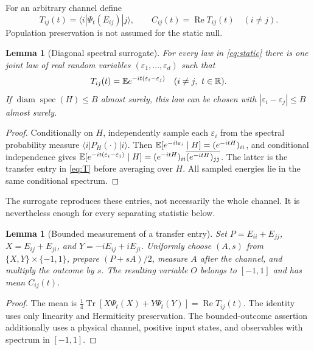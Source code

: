 \documentclass[11pt,a4paper]{article}
\newtheorem{lemma}[theorem]{Lemma}
\theoremstyle{remark}\newtheorem{remark}[theorem]{Remark}
\newcommand{\R}{\mathbb R}\newcommand{\C}{\mathbb C}
\newcommand{\Tr}{\operatorname{Tr}}
\newcommand{\diam}{\operatorname{diam}}
\newcommand{\Rea}{\operatorname{Re}}
\begin{document}
For an arbitrary channel define
\begin{equation}\label{eq:T}
 T_{ij}(t)=\langle i|\Psi_t(E_{ij})|j\rangle,\qquad
 C_{ij}(t)=\Rea T_{ij}(t)\quad(i\ne j).
\end{equation}
Population preservation is not assumed for the static null.

\begin{lemma}[Diagonal spectral surrogate]\label{lem:surrogate}
For every law in \eqref{eq:static} there is one joint law of real random
variables $(\varepsilon_1,\ldots,\varepsilon_d)$ such that
\begin{equation}\label{eq:surrogate}
 T_{ij}(t)=\E e^{-it(\varepsilon_i-\varepsilon_j)}
 \quad(i\ne j,\ t\in\R).
\end{equation}
If $\diam\operatorname{spec}(H)\leq B$ almost surely, this law can be
chosen with $|\varepsilon_i-\varepsilon_j|\leq B$ almost surely.
\end{lemma}
\begin{proof}
Conditionally on $H$, independently sample each $\varepsilon_i$ from
the spectral probability measure $\langle i|P_H(\cdot)|i\rangle$.
Then $\mathbb E[e^{-it\varepsilon_i}\mid H]=(e^{-itH})_{ii}$, and conditional
independence gives
$\mathbb E[e^{-it(\varepsilon_i-\varepsilon_j)}\mid H]
=(e^{-itH})_{ii}\overline{(e^{-itH})_{jj}}$.
The latter is the transfer entry in \eqref{eq:T} before averaging over
$H$. All sampled energies lie in the same conditional spectrum.
\end{proof}

The surrogate reproduces these entries, not necessarily the whole
channel. It is nevertheless enough for every separating statistic below.

\begin{lemma}[Bounded measurement of a transfer entry]\label{lem:phase}
Set $P=E_{ii}+E_{jj}$, $X=E_{ij}+E_{ji}$, and
$Y=-iE_{ij}+iE_{ji}$. Uniformly choose $(A,s)$ from
$\{X,Y\}\times\{-1,1\}$, prepare $(P+sA)/2$, measure $A$ after the
channel, and multiply the outcome by $s$. The resulting variable $O$
belongs to $[-1,1]$ and has mean $C_{ij}(t)$.
\end{lemma}
\begin{proof}
The mean is
$\frac14\Tr[X\Psi_t(X)+Y\Psi_t(Y)]=\Rea T_{ij}(t)$.
The identity uses only linearity and Hermiticity preservation.
The bounded-outcome assertion additionally uses a physical channel,
positive input states, and observables with spectrum in $[-1,1]$.
\end{proof}
\end{document}
